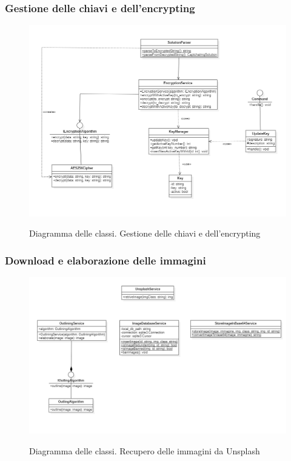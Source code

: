 \newpage

\subsubsection{Gestione delle chiavi e dell'encrypting}

\begin{figure}[H]
	\centering
	\includegraphics[scale = 0.55]{img/key_manager.png}\\
	\caption{Diagramma delle classi. Gestione delle chiavi e dell'encrypting}
\end{figure}
\newpage

\subsubsection{Download e elaborazione delle immagini}

\begin{figure}[H]
    \centering
    \includegraphics[scale = 0.6]{img/downloadImg.png}\\
    \caption{Diagramma delle classi. Recupero delle immagini da Unsplash}
\end{figure}

